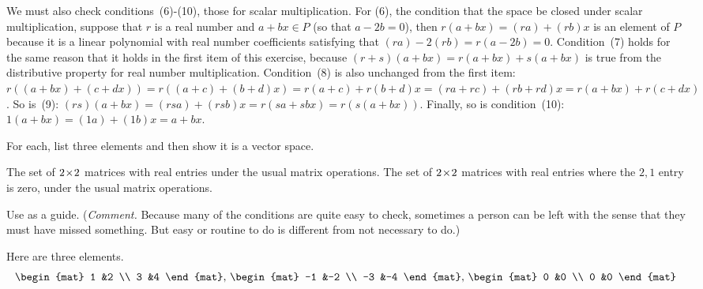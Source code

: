 \begin{exercises}
\begin{answer}
\begin{exparts}
          We must also check conditions~(6)-(10), those for 
          scalar multiplication.
          For (6), the condition that the space be closed under scalar
          multiplication, 
          suppose that $r$ is a real number and $a+bx\in P$ (so that $a-2b=0$),
          then $r(a+bx)=(ra)+(rb)x$ is an element of 
          $P$ because it is a linear polynomial with real
          number coefficients satisfying that $(ra)-2(rb)=r(a-2b)=0$.
          Condition~(7) holds for the same reason that it holds in 
          the first item of this exercise, because 
          $(r+s)(a+bx)=r(a+bx)+s(a+bx)$ is true from the distributive property
          for real number multiplication.
          Condition~(8) is also unchanged from the first item: 
          $r((a+bx)+(c+dx))=r((a+c)+(b+d)x)=r(a+c)+r(b+d)x=(ra+rc)+(rb+rd)x
          =r(a+bx)+r(c+dx)$.
          So is~(9): 
          $(rs)(a+bx)=(rsa)+(rsb)x=r(sa+sbx)=r(s(a+bx))$.
          Finally, so is condition~(10): 
          $1(a+bx)=(1a)+(1b)x=a+bx$.
       \end{exparts}
     \end{answer}
  \item 
    For each, list three elements and then show it is a vector space.
    \begin{exparts}
      \partsitem The set of \( 2 \! \times \! 2 \) matrices with real entries under
        the usual matrix operations.
      \partsitem The set of \( 2 \! \times \! 2 \) matrices with real entries where
        the $2,1$ entry is zero,  under
        the usual matrix operations.
    \end{exparts}
    \begin{answer}
      Use
       as a guide.
      (\textit{Comment.} 
      Because many of the conditions are quite easy to check,
      sometimes a person can be left with the sense that they must have missed
      something.
      But easy or routine to do is different from not necessary to do.)
      \begin{exparts}
        \partsitem 
          Here are three elements.
          \begin{equation*}
            \begin{mat}
              1  &2  \\
              3  &4
            \end{mat},\,
            \begin{mat}
              -1  &-2  \\
              -3  &-4
            \end{mat},\,
            \begin{mat}
              0  &0  \\
              0  &0
            \end{mat}
          \end{equation*}


\end{exparts}
\end{answer}
\end{exercises}
